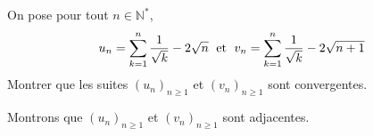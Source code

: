 \documentclass[a4paper,10pt]{report}
\begin{document}
\everymath{\displaystyle}

\begin{center}
\end{center}

\bigskip


\setlength{\shadowsize}{2pt} 



\begin{Exa}
On pose pour tout $n \in \mathbb{N}^*$, 
    \[
    u_n = \sum_{k = 1}^n {\frac{1}{\sqrt k}} - 2\sqrt n \; \hbox{ et } \; v_n = \sum_{k = 1}^n {\frac{1}{\sqrt k}} - 2\sqrt {n + 1}
    \]
 Montrer que les suites $(u_n)_{n \geq 1}$ et $(v_n)_{n \geq 1}$ sont convergentes.
 \end{Exa}
 
 
\corr Montrons que $(u_n)_{n \geq 1}$ et $(v_n)_{n \geq 1}$ sont adjacentes.
\end{document}
